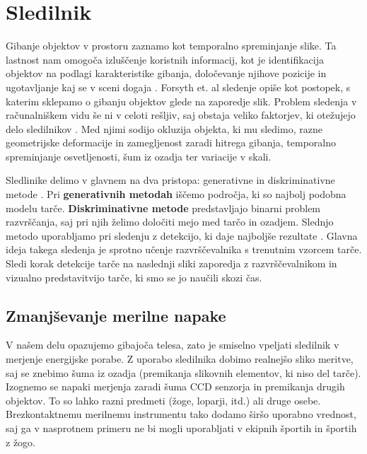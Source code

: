 {\section{Sledilnik}
%
Gibanje objektov v prostoru zaznamo kot temporalno spreminjanje slike. Ta lastnost nam omogoča izluščenje koristnih informacij, kot je identifikacija objektov na podlagi karakteristike gibanja, določevanje njihove pozicije in ugotavljanje kaj se v sceni dogaja \cite{forsyth2002computer}. Forsyth et. al \cite{forsyth2002computer} sledenje opiše kot postopek, s katerim sklepamo o gibanju objektov glede na zaporedje slik. Problem sledenja v računalniškem vidu še ni v celoti rešljiv, saj obstaja veliko faktorjev, ki otežujejo delo sledilnikov \cite{danelljan2014adaptive}. Med njimi sodijo okluzija objekta, ki mu sledimo, razne geometrijske deformacije in zamegljenost zaradi hitrega gibanja, temporalno spreminjanje osvetljenosti, šum iz ozadja ter variacije v skali. 

Sledlinike delimo v glavnem na dva pristopa: generativne in diskriminativne metode \cite{danelljan2014adaptive}. Pri \textbf{generativnih metodah} iščemo področja, ki so najbolj podobna modelu tarče. \textbf{Diskriminativne metode} predstavljajo binarni problem razvrščanja, saj pri njih želimo določiti mejo med tarčo in ozadjem. Slednjo metodo uporabljamo pri sledenju z detekcijo, ki daje najboljše rezultate \cite{danelljan2014adaptive}. Glavna ideja takega sledenja je sprotno učenje razvrščevalnika s trenutnim vzorcem tarče. Sledi korak detekcije tarče na naslednji sliki zaporedja z razvrščevalnikom in vizualno predstavitvijo tarče, ki smo se jo naučili skozi čas.






\subsection{Zmanjševanje merilne napake}

V našem delu opazujemo gibajoča telesa, zato je smiselno vpeljati sledilnik v merjenje energijske porabe. Z uporabo sledilnika dobimo realnejšo sliko meritve, saj se znebimo šuma iz ozadja (premikanja slikovnih elementov, ki niso del tarče). Izognemo se napaki merjenja zaradi šuma CCD senzorja in premikanja drugih objektov. To so lahko razni predmeti (žoge, loparji, itd.) ali druge osebe. Brezkontaktnemu merilnemu instrumentu tako dodamo širšo uporabno vrednost, saj ga v nasprotnem primeru ne bi mogli uporabljati v ekipnih športih in športih z žogo. 

}
